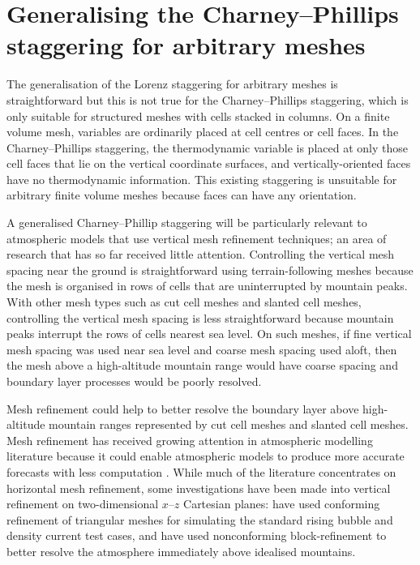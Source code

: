 \section{Generalising the Charney–Phillips staggering for arbitrary meshes}
\label{sec:cp:method}

The generalisation of the Lorenz staggering for arbitrary meshes is straightforward \citep{weller-shahrokhi2014} but this is not true for the Charney--Phillips staggering, which is only suitable for structured meshes with cells stacked in columns.
On a finite volume mesh, variables are ordinarily placed at cell centres or cell faces.
In the Charney--Phillips staggering, the thermodynamic variable is placed at only those cell faces that lie on the vertical coordinate surfaces, and vertically-oriented faces have no thermodynamic information.
This existing staggering is unsuitable for arbitrary finite volume meshes because faces can have any orientation.

A generalised Charney--Phillip staggering will be particularly relevant to atmospheric models that use vertical mesh refinement techniques; an area of research that has so far received little attention.
Controlling the vertical mesh spacing near the ground is straightforward using terrain-following meshes because the mesh is organised in rows of cells that are uninterrupted by mountain peaks.
With other mesh types such as cut cell meshes and slanted cell meshes, controlling the vertical mesh spacing is less straightforward because mountain peaks interrupt the rows of cells nearest sea level.
On such meshes, if fine vertical mesh spacing was used near sea level and coarse mesh spacing used aloft, then the mesh above a high-altitude mountain range would have coarse spacing and boundary layer processes would be poorly resolved.

Mesh refinement could help to better resolve the boundary layer above high-altitude mountain ranges represented by cut cell meshes and slanted cell meshes.
Mesh refinement has received growing attention in atmospheric modelling literature because it could enable atmospheric models to produce more accurate forecasts with less computation \citep{behrens2006,jablonowski2009}.
While much of the literature concentrates on horizontal mesh refinement, some investigations have been made into vertical refinement on two-dimensional $x$--$z$ Cartesian planes:
\citet{mueller2013} have used conforming refinement of triangular meshes for simulating the standard rising bubble and density current test cases, and \citet{yamazaki-satomura2012} have used nonconforming block-refinement to better resolve the atmosphere immediately above idealised mountains.


